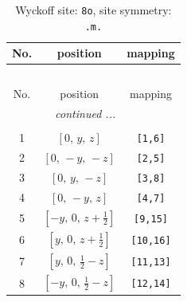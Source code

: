 \documentclass[fleqn,8pt]{jsarticle}
\begin{document}
\renewcommand{\arraystretch}{1.2}
\begin{longtable}{ccc}
\caption{Wyckoff site: {\tt 8o}, site symmetry: {\tt .m.}}
 \\
 \hline \hline
No. & position & mapping \\ \hline \endfirsthead

\multicolumn{2}{l}{\tablename\ \thetable{}} \\
 \hline \hline
No. & position & mapping \\ \hline \endhead

 \hline \hline
\multicolumn{2}{r}{\footnotesize\it continued ...} \\ \endfoot

 \hline \hline
\multicolumn{2}{r}{} \\ \endlastfoot

1 & $\left[ 0,\, y,\, z \right]$ & {\tt [1,6]} \\ \hline
2 & $\left[ 0,\, - y,\, - z \right]$ & {\tt [2,5]} \\ \hline
3 & $\left[ 0,\, y,\, - z \right]$ & {\tt [3,8]} \\ \hline
4 & $\left[ 0,\, - y,\, z \right]$ & {\tt [4,7]} \\ \hline
5 & $\left[ - y,\, 0,\, z + \frac{1}{2} \right]$ & {\tt [9,15]} \\ \hline
6 & $\left[ y,\, 0,\, z + \frac{1}{2} \right]$ & {\tt [10,16]} \\ \hline
7 & $\left[ y,\, 0,\, \frac{1}{2} - z \right]$ & {\tt [11,13]} \\ \hline
8 & $\left[ - y,\, 0,\, \frac{1}{2} - z \right]$ & {\tt [12,14]} \\
\end{longtable}
\renewcommand{\arraystretch}{1.2}
\end{document}
